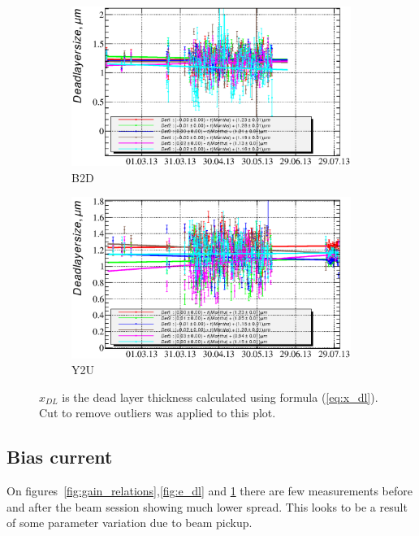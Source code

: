 \documentclass[a4paper]{article}
\begin{document}
\begin{figure}[p]
\begin{subfigure}[b]{0.5\textwidth}
\includegraphics[width=\textwidth]{gfx/run13_alpha_study/B2D/c_chDeadLayerSize_by_day_B2D.eps}
\caption{B2D}
\end{subfigure}
\begin{subfigure}[b]{0.5\textwidth}
\includegraphics[width=\textwidth]{gfx/run13_alpha_study/Y2U/c_chDeadLayerSize_by_day_Y2U.eps}
\caption{Y2U}
\end{subfigure}
\caption{$x_{DL}$ is the dead layer thickness calculated using formula (\ref{eq:x_dl}). Cut to remove
outliers was applied to this plot.}
\label{fig:x_dl}
\end{figure}

\subsection{Bias current}


On figures~\ref{fig:gain_relations},\ref{fig:e_dl} and \ref{fig:x_dl} there are few measurements
before and after the beam session showing much lower spread. This looks to be a result of some
parameter variation due to beam pickup.
\end{document}
